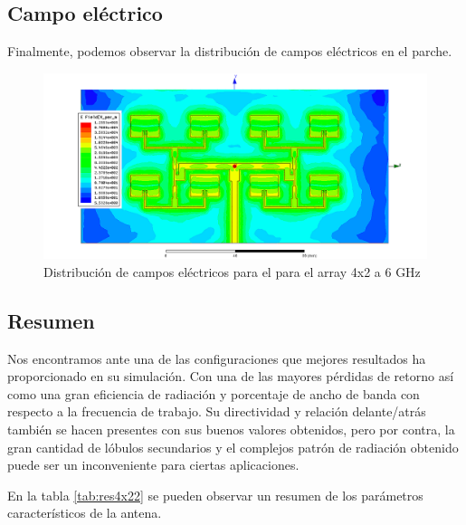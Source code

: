 \subsection{Campo eléctrico}
\par Finalmente, podemos observar la distribución de campos eléctricos en el parche. 

\begin{figure}[H]
    \centering
        \includegraphics[width=\textwidth]{archivos/analisis/4x22/8}
        \caption{Distribución de campos eléctricos para el para el array 4x2 a 6 GHz}
        \label{fig:elec4x22}
\end{figure}

\subsection{Resumen}
\par Nos encontramos ante una de las configuraciones que mejores resultados ha proporcionado en su simulación. Con una de las mayores pérdidas de retorno así como una gran eficiencia de radiación y porcentaje de ancho de banda con respecto a la frecuencia de trabajo. Su directividad y relación delante/atrás también se hacen presentes con sus buenos valores obtenidos, pero por contra, la gran cantidad de lóbulos secundarios y el complejos patrón de radiación obtenido puede ser un inconveniente para ciertas aplicaciones.
\\
\par En la tabla \ref{tab:res4x22} se pueden observar un resumen de los parámetros característicos de la antena.

